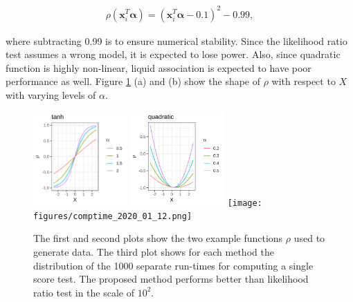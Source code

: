 \documentclass[aap,authoryear, preprint]{imsart}
\numberwithin{equation}{section}
\theoremstyle{plain}
\begin{document}
\begin{align}
    \rho(\bm{x}_i^T\bm{\alpha}) = (\bm{x}_i^T\bm{\alpha} - 0.1)^2 - 0.99,
    \label{eq:data_generating2_quadratic}
\end{align}

\noindent where subtracting 0.99 is to ensure numerical stability. Since the likelihood ratio test assumes a wrong model, it is expected to lose power. Also, since quadratic function is highly non-linear, liquid association is expected to have poor performance as well. Figure \ref{fig:sim} (a) and (b) show the shape of $\rho$ with respect to $X$ with varying levels of $\alpha$. \\
\begin{figure}
         \includegraphics[width=0.32\textwidth]{figures/tanh.png}
         \includegraphics[width=0.32\textwidth]{figures/quadratic.png}
        \texttt{[image: figures/comptime\_2020\_01\_12.png]}
        \caption{The first and second plots show the two example functions $\rho$ used to generate data. The third plot shows for each method the distribution of the 1000 separate run-times for computing a single score test. The proposed method performs better than likelihood ratio test in the scale of $10^2$.}
        \label{fig:sim}
\end{figure}
\end{document}
